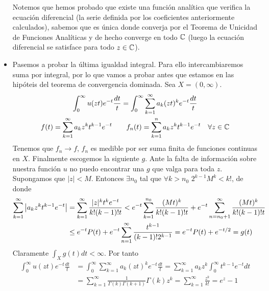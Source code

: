 \documentclass[twoside]{article}
\begin{document}
\begin{ejercicio}{1}
\begin{solucion}
\begin{itemize}
Notemos que hemos probado que existe una función analítica que verifica la ecuación diferencial (la serie definida por los coeficientes anteriormente calculados), sabemos que es única donde converja por el Teorema de Unicidad de Funciones Analíticas y de hecho converge en todo $\mathbb{C}$ (luego la ecuación diferencial se satisface para todo $z\in \mathbb{C}$). 
\item Pasemos a probar la última igualdad integral. Para ello intercambiaremos suma por integral, por lo que vamos a probar antes que estamos en las hipóteis del teorema de convergencia dominada. Sea $X=(0,\infty)$.
\begin{gather*}
\int_0^\infty u(zt)e^{-t}\frac{dt}{t} = \int_0^\infty \sum_{k=1}^\infty a_k (zt)^k e^{-t}\frac{dt}{t}\\
f(t)=\sum_{k=1}^\infty a_kz^kt^{k-1}e^{-t}  \qquad f_n(t) = \sum_{k=1}^n a_kz^kt^{k-1}e^{-t} \quad \forall z\in \mathbb{C}
\end{gather*}
Tenemos que $f_n \to f$, $f_n$ es medible por ser suma finita de funciones continuas en $X$. Finalmente escogemos la siguiente $g$. Ante la falta de información sobre nuestra función $u$ no puedo encontrar una $g$ que valga para toda $z$. Supongamos que $|z|<M$. Entonces $\exists n_0$ tal que $\forall k>n_0$ $2^{k-1} M^k<k!$, de donde
\begin{align*}
\sum_{k=1}^\infty \left\lvert a_kz^kt^{k-1}e^{-t}\right\rvert &= \sum_{k=1}^\infty  \frac{|z|^kt^{k}e^{-t}}{k!(k-1)!t} < e^{-t}\sum_{k=1}^{n_0} \frac{(Mt)^k}{k!(k-1)!t} + e^{-t}\sum_{n=n_0+1}^\infty \frac{(Mt)^k}{k!(k-1)!t}\\
&\leq e^{-t}P(t) + e^{-t}\sum_{n=1}^\infty \frac{t^{k-1}}{(k-1)!2^{k-1}} = e^{-t}P(t)+e^{-t/2} =g(t)
\end{align*}
Claramente $\int_X g(t)dt < \infty$. Por tanto
\begin{align*}
\int_0^\infty u(zt)e^{-t}\frac{dt}{t} & = \int_0^\infty \sum_{k=1}^\infty a_k (zt)^k e^{-t}\frac{dt}{t}= \sum_{k=1}^\infty a_k z^k  \int_0^\infty t^{k-1}e^{-t}dt\\
&= \sum_{k=1}^\infty \frac{1}{\Gamma(k)\Gamma(k+1)} \Gamma(k) z^k =  \sum_{k=1}^\infty \frac{z^k}{k!} = e^z -1
\end{align*}
\end{itemize}
\end{solucion}
\end{ejercicio}
\end{document}
